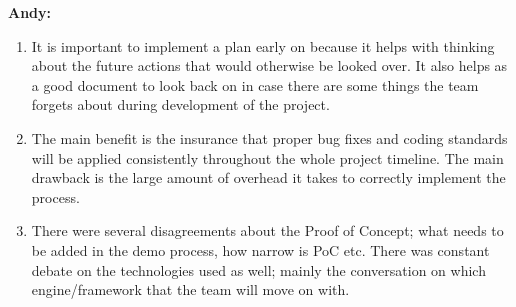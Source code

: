 \textbf{Andy: }
\begin {enumerate}
    \item It is important to implement a plan early on because it helps with thinking about the future actions that would otherwise
    be looked over. It also helps as a good document to look back on in case there are some things the team forgets about during development of the project.

    \item The main benefit is the insurance that proper bug fixes and coding standards will be applied consistently throughout the whole project timeline.
    The main drawback is the large amount of overhead it takes to correctly implement the process. 
    \item There were several disagreements about the Proof of Concept; what needs to be added in the demo process, how narrow is PoC etc. There was constant
    debate on the technologies used as well; mainly the conversation on which engine/framework that the team will move on with.
\end{enumerate}
